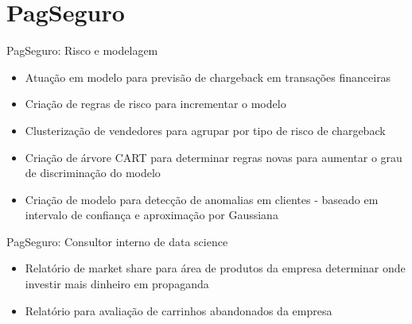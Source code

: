 \section{PagSeguro}

\begin{frame}	
	\begin{block}{PagSeguro: Risco e modelagem}	
		\begin{itemize}
			\item Atuação em modelo para previsão de chargeback em transações financeiras
			\item Criação de regras de risco para incrementar o modelo
			\item Clusterização de vendedores para agrupar por tipo de risco de chargeback
			\item Criação de árvore CART para determinar regras novas para aumentar o grau de discriminação do modelo
			\item Criação de modelo para detecção de anomalias em clientes - baseado em intervalo de confiança e aproximação por Gaussiana 
		\end{itemize}		
	\end{block}
\end{frame}


\begin{frame}	
	\begin{block}{PagSeguro: Consultor interno de data science}	
		\begin{itemize}
			\item Relatório de market share para área de produtos da empresa determinar onde investir mais dinheiro em propaganda
			\item Relatório para avaliação de carrinhos abandonados da empresa
		\end{itemize}
	\end{block}
\end{frame}